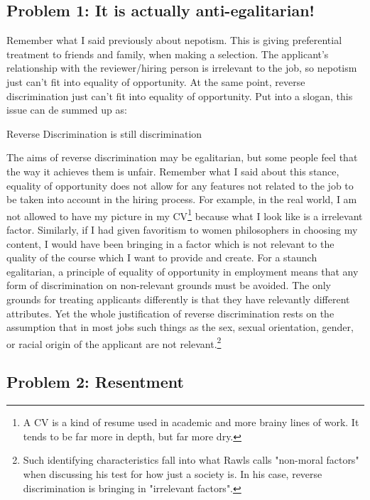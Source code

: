 \subsection{Problem 1: It is actually anti-egalitarian!}

Remember what I said previously about nepotism. This is giving preferential treatment to friends and family, when making a selection. The applicant's relationship with the reviewer/hiring person is irrelevant to the job, so nepotism just can't fit into equality of opportunity. At the same point, reverse discrimination just can't fit into equality of opportunity. Put into a slogan, this issue can de summed up as:
\begin{center}
Reverse Discrimination is still discrimination
\end{center}
The aims of reverse discrimination may be egalitarian, but some people feel that the way it achieves them is unfair. Remember what I said about this stance, equality of opportunity does not allow for any features not related to the job to be taken into account in the hiring process. For example, in the real world, I am not allowed to have my picture in my CV\footnote{A CV is a kind of resume used in academic and more brainy lines of work. It tends to be far more in depth, but far more dry.} because what I look like is a irrelevant factor. Similarly, if I had given favoritism to women philosophers in choosing my content, I would have been bringing in a factor which is not relevant to the quality of the course which I want to provide and create. For a staunch egalitarian, a principle of equality of opportunity in employment means that any form of discrimination on non-relevant grounds must be avoided. The only grounds for treating applicants differently is that they have relevantly different attributes. Yet the whole justification of reverse discrimination rests on the assumption that in most jobs such things as the sex, sexual orientation, gender, or racial origin of the applicant are not relevant.\footnote{Such identifying characteristics fall into what Rawls calls "non-moral factors" when discussing his test for how just a society is. In his case, reverse discrimination is bringing in "irrelevant factors".}
\subsection{Problem 2: Resentment}

